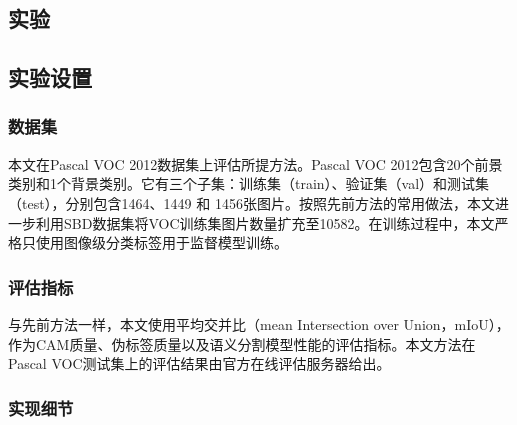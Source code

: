 \begin{CJK*}{UTF8}{zhhei}
    \vskip 1mm
    \section{实验}
\end{CJK*}


\begin{CJK*}{UTF8}{zhhei}
    \subsection{实验设置}
\end{CJK*}

\begin{CJK*}{UTF8}{zhhei}
    \subsubsection{数据集}
\end{CJK*}
本文在Pascal VOC 2012\cite{18everingham2010pascal}数据集上评估所提方法。Pascal VOC 2012包含20个前景类别和1个背景类别。它有三个子集：训练集（train）、验证集（val）和测试集（test），分别包含1464、1449 和 1456张图片。按照先前方法\cite{06wang2020self,12xu2022multi,13ru2022learning,03ru2023token}的常用做法，本文进一步利用SBD数据集将VOC训练集图片数量扩充至10582。在训练过程中，本文严格只使用图像级分类标签用于监督模型训练。

\begin{CJK*}{UTF8}{zhhei}
    \subsubsection{评估指标}
\end{CJK*}
与先前方法一样，本文使用平均交并比（mean Intersection over Union，mIoU），作为CAM质量、伪标签质量以及语义分割模型性能的评估指标。本文方法在Pascal VOC测试集上的评估结果由官方在线评估服务器给出。

\begin{CJK*}{UTF8}{zhhei}
    \subsubsection{实现细节}
\end{CJK*}

